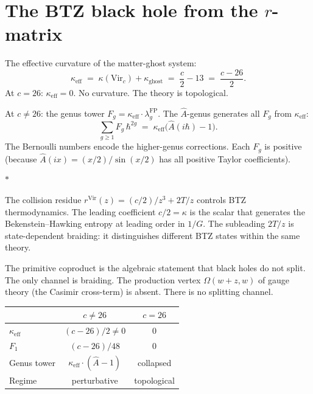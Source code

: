 \documentclass[11pt]{article}
\newcommand{\sep}{\bigskip\begin{center}$*$\end{center}\medskip}
\begin{document}
\section{The BTZ black hole from the $r$-matrix}
\label{sec:btz}

The effective curvature of the matter-ghost system:
\[
\kappa_{\mathrm{eff}}
\;=\;
\kappa(\mathrm{Vir}_c) + \kappa_{\mathrm{ghost}}
\;=\;
\frac{c}{2} - 13
\;=\;
\frac{c-26}{2}.
\]
At $c = 26$: $\kappa_{\mathrm{eff}} = 0$.  No curvature.
The theory is topological.

At $c \neq 26$: the genus tower
$F_g = \kappa_{\mathrm{eff}} \cdot \lambda_g^{\mathrm{FP}}$.
The $\hat{A}$-genus generates all $F_g$ from $\kappa_{\mathrm{eff}}$:
\[
\sum_{g \geq 1} F_g\,\hbar^{2g}
\;=\;
\kappa_{\mathrm{eff}}
\bigl(\hat{A}(i\hbar) - 1\bigr).
\]
The Bernoulli numbers encode the higher-genus corrections.  Each
$F_g$ is positive (because $\hat{A}(ix) = (x/2)/\sin(x/2)$ has
all positive Taylor coefficients).

\sep

The collision residue
$r^{\mathrm{Vir}}(z) = (c/2)/z^3 + 2T/z$ controls BTZ
thermodynamics.  The leading coefficient $c/2 = \kappa$ is the
scalar that generates the Bekenstein--Hawking entropy at leading
order in $1/G$.  The subleading $2T/z$ is state-dependent braiding:
it distinguishes different BTZ states within the same theory.

The primitive coproduct is the algebraic statement that black holes
do not split.  The only channel is braiding.  The production
vertex $\Omega(w{+}z,w)$ of gauge theory (the Casimir cross-term)
is absent.  There is no splitting channel.

\begin{center}
\small
\renewcommand{\arraystretch}{1.15}
\begin{tabular}{@{}lcc@{}}
& $c \neq 26$ & $c = 26$ \\
\hline
$\kappa_{\mathrm{eff}}$ & $(c-26)/2 \neq 0$ & $0$ \\[3pt]
$F_1$ & $(c-26)/48$ & $0$ \\[3pt]
Genus tower & $\kappa_{\mathrm{eff}}\cdot(\hat{A}-1)$ & collapsed \\[3pt]
Regime & perturbative & topological
\end{tabular}
\end{center}


\end{document}
